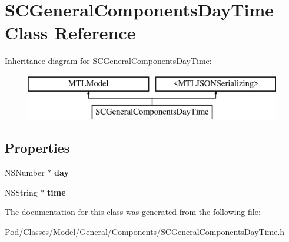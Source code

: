 \hypertarget{interface_s_c_general_components_day_time}{}\section{S\+C\+General\+Components\+Day\+Time Class Reference}
\label{interface_s_c_general_components_day_time}
Inheritance diagram for S\+C\+General\+Components\+Day\+Time\+:\begin{figure}[H]
\begin{center}
\leavevmode
\includegraphics[height=2.000000cm]{interface_s_c_general_components_day_time}
\end{center}
\end{figure}
\subsection*{Properties}
\begin{DoxyCompactItemize}
\item 
N\+S\+Number $\ast$ {\bfseries day}\hypertarget{interface_s_c_general_components_day_time_a75f66feeb5baaa3aa2c327b444bfd462}{}\label{interface_s_c_general_components_day_time_a75f66feeb5baaa3aa2c327b444bfd462}

\item 
N\+S\+String $\ast$ {\bfseries time}\hypertarget{interface_s_c_general_components_day_time_aea981979508b3e083934d4c7fb5a3aa4}{}\label{interface_s_c_general_components_day_time_aea981979508b3e083934d4c7fb5a3aa4}

\end{DoxyCompactItemize}


The documentation for this class was generated from the following file\+:\begin{DoxyCompactItemize}
\item 
Pod/\+Classes/\+Model/\+General/\+Components/S\+C\+General\+Components\+Day\+Time.\+h\end{DoxyCompactItemize}
